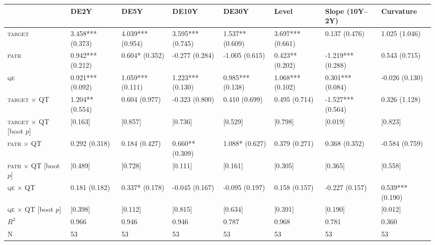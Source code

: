 \begin{tabular}{llllllll}
\toprule
 & DE2Y & DE5Y & DE10Y & DE30Y & Level & Slope (10Y--2Y) & Curvature \\
\midrule
\textsc{target} & 3.458*** (0.373) & 4.039*** (0.954) & 3.595*** (0.745) & 1.537** (0.609) & 3.697*** (0.661) & 0.137 (0.476) & 1.025 (1.046) \\
\textsc{path} & 0.942*** (0.212) & 0.604* (0.352) & -0.277 (0.284) & -1.005 (0.615) & 0.423** (0.202) & -1.219*** (0.288) & 0.543 (0.715) \\
\textsc{qe} & 0.921*** (0.092) & 1.059*** (0.111) & 1.223*** (0.130) & 0.985*** (0.138) & 1.068*** (0.102) & 0.301*** (0.084) & -0.026 (0.130) \\
\textsc{target} $\times$ QT & 1.204** (0.554) & 0.604 (0.977) & -0.323 (0.800) & 0.410 (0.699) & 0.495 (0.714) & -1.527*** (0.564) & 0.326 (1.128) \\
\textsc{target} $\times$ QT [boot $p$] & [0.163] & [0.857] & [0.736] & [0.529] & [0.798] & [0.019] & [0.823] \\
\textsc{path} $\times$ QT & 0.292 (0.318) & 0.184 (0.427) & 0.660** (0.309) & 1.088* (0.627) & 0.379 (0.271) & 0.368 (0.352) & -0.584 (0.759) \\
\textsc{path} $\times$ QT [boot $p$] & [0.489] & [0.728] & [0.111] & [0.161] & [0.305] & [0.365] & [0.558] \\
\textsc{qe} $\times$ QT & 0.181 (0.182) & 0.337* (0.178) & -0.045 (0.167) & -0.095 (0.197) & 0.158 (0.157) & -0.227 (0.157) & 0.539*** (0.190) \\
\textsc{qe} $\times$ QT [boot $p$] & [0.398] & [0.112] & [0.815] & [0.634] & [0.391] & [0.190] & [0.012] \\
$R^2$ & 0.966 & 0.946 & 0.946 & 0.787 & 0.968 & 0.781 & 0.360 \\
N & 53 & 53 & 53 & 53 & 53 & 53 & 53 \\
\bottomrule
\end{tabular}
